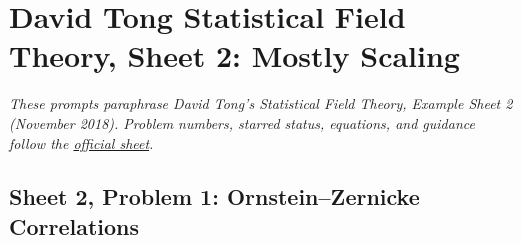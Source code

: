 \section{David Tong Statistical Field Theory, Sheet 2: Mostly Scaling}

\noindent\textit{These prompts paraphrase David Tong's \emph{Statistical Field Theory},
Example Sheet 2 (November 2018). Problem numbers, starred status, equations,
and guidance follow the
\href{https://davidtong.org/pdfs/teaching/statistical-field-theory/99b.pdf}{official sheet}.}

\subsection{Sheet 2, Problem 1: Ornstein--Zernicke Correlations}

